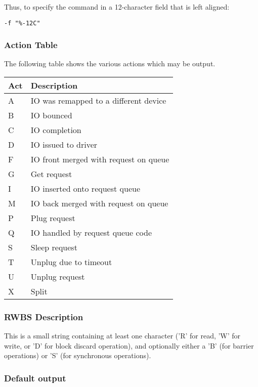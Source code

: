 \documentclass{article}
\begin{document}
Thus, to specify the command in a 12-character field that is left aligned:

\begin{verbatim}
-f "%-12C"
\end{verbatim}

\newpage
\subsubsection{\label{sec:act-table}Action Table}
The following table shows the various actions which may be output.

\begin{tabular}{|l|l|}\hline
Act & Description \\ \hline\hline
A & IO was remapped to a different device \\ \hline
B & IO bounced \\ \hline
C & IO completion \\ \hline
D & IO issued to driver \\ \hline
F & IO front merged with request on queue \\ \hline
G & Get request \\ \hline
I & IO inserted onto request queue \\ \hline
M & IO back merged with request on queue \\ \hline
P & Plug request \\ \hline
Q & IO handled by request queue code \\ \hline
S & Sleep request \\ \hline
T & Unplug due to timeout \\ \hline
U & Unplug request \\ \hline
X & Split \\ \hline
\end{tabular}

\subsubsection{\label{sec:act-table}RWBS Description}
This is a small string containing at least one character ('R' for read,
'W' for write, or 'D' for block discard operation), and optionally either
a 'B' (for barrier operations) or 'S' (for synchronous operations).

\subsubsection{\label{sec:default-output}Default output}
\end{document}
